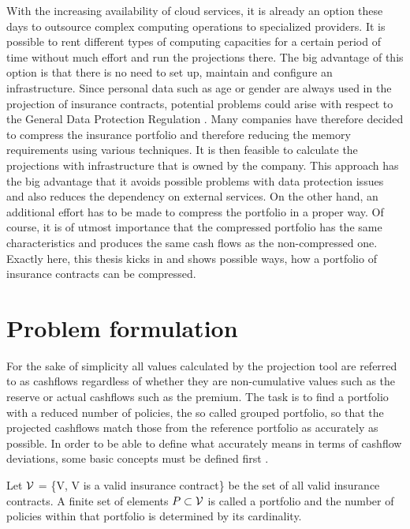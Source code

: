 With the increasing availability of cloud services, it is already an option these days to outsource complex computing operations to specialized providers. It is possible to rent different types of computing capacities for a certain period of time without much effort and run the projections there. The big advantage of this option is that there is no need to set up, maintain and configure an infrastructure. Since personal data such as age or gender are always used in the projection of insurance contracts, potential problems could arise with respect to the General Data Protection Regulation \cite{datenschutz}. Many companies have therefore decided to compress the insurance portfolio and therefore reducing the memory requirements using various techniques. It is then feasible to calculate the projections with infrastructure that is owned by the company. This approach has the big advantage that it avoids possible problems with data protection issues and also reduces the dependency on external services. On the other hand, an additional effort has to be made to compress the portfolio in a proper way. Of course, it is of utmost importance that the compressed portfolio has the same characteristics and produces the same cash flows as the non-compressed one. Exactly here, this thesis kicks in and shows possible ways, how a portfolio of insurance contracts can be compressed. 

\section{Problem formulation}
For the sake of simplicity all values calculated by the projection tool are referred to as cashflows regardless of whether they are non-cumulative values such as the reserve or actual cashflows such as the premium. The task is to find a portfolio with a reduced number of policies, the so called grouped portfolio, so that the projected cashflows match those from the reference  portfolio as accurately as possible. In order to be able to define what accurately means in terms of cashflow deviations, some basic concepts must be defined first . 

\begin{definition}
	Let $\mathcal{V}$ = \{V, V is a valid insurance contract\} be the set of all valid insurance contracts. A finite set of elements $P \subset \mathcal{V}$ is called a portfolio and the number of policies within that portfolio is determined by its cardinality.
\end{definition}

